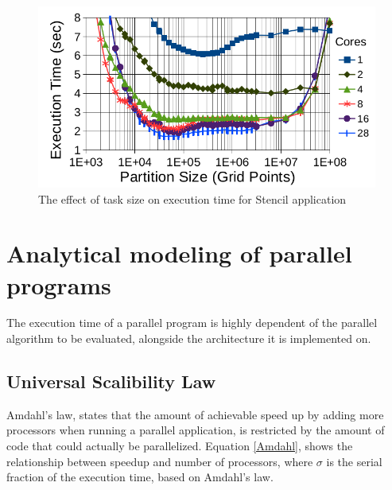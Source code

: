 \vspace{\baselineskip}
\begin{figure}[H]
	\centering
	\includegraphics[scale=0.6]{images/task_granularity.png}
	\caption{The effect of task size on execution time for Stencil application \cite{grubel2015performance}}	
	\label{fig_task_gran}
\end{figure}


\section{Analytical modeling of parallel programs}

The execution time of a parallel program is highly dependent of the parallel algorithm to be evaluated, alongside the architecture it is implemented on\cite{grama2003introduction}.

\vspace{\baselineskip}
\subsection{Universal Scalibility Law}
Amdahl's law\cite{amdahl1967validity}, states that the amount of achievable speed up by adding more processors when running a parallel application, is restricted by the amount of code that could actually be parallelized. 
Equation \ref{Amdahl}, shows the relationship between speedup and number of processors, where $\sigma$ is the serial fraction of the execution time, based on Amdahl's law\cite{gunther2007guerrilla}. 

